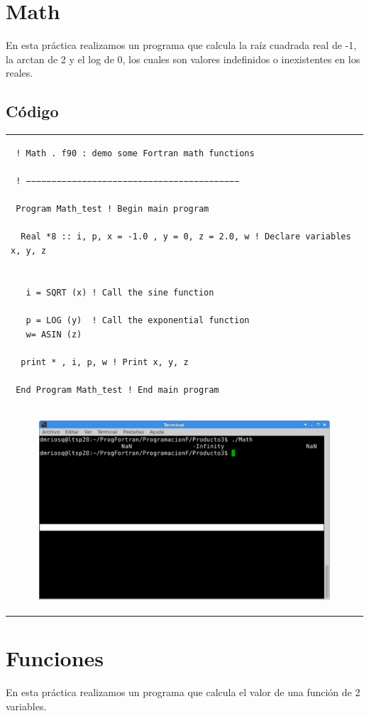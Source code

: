 \documentclass[10pt]{article}
\begin{document}
\section{Math}
En esta práctica realizamos un programa que calcula la raíz cuadrada real de -1, la arctan de 2 y el log de 0, los cuales son valores indefinidos o inexistentes en los reales.

\subsection{Código}
\begin{tabular}{l}
\begin{verbatim}  
 ! Math . f90 : demo some Fortran math functions

 ! −−−−−−−−−−−−−−−−−−−−−−−−−−−−−−−−−−−−−−−−−−

 Program Math_test ! Begin main program

  Real *8 :: i, p, x = -1.0 , y = 0, z = 2.0, w ! Declare variables x, y, z

 
   i = SQRT (x) ! Call the sine function

   p = LOG (y)  ! Call the exponential function
   w= ASIN (z)

  print * , i, p, w ! Print x, y, z

 End Program Math_test ! End main program 
\end{verbatim} \\
\begin{figure}
  \centering
    \includegraphics[scale=0.4]{M}
\end{figure}
\end{tabular}





\section{Funciones}
En esta práctica realizamos un programa que calcula el valor de una función de 2 variables.
\end{document}
